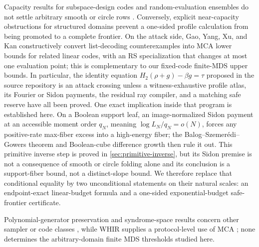 \documentclass[11pt,a4paper]{amsart}
\numberwithin{equation}{section}
\theoremstyle{remark}
\begin{document}
Capacity results for subspace-design codes and random-evaluation ensembles
do not settle arbitrary smooth or circle rows
\cite{GoyalGuruswami25,GoyalGuruswamiSunWootters26}.  Conversely, explicit
near-capacity obstructions for structured domains
\cite{CS25,KKH26,Kambire26} prevent a one-sided profile calculation from
being promoted to a complete frontier.  On the attack side, Gao, Yang, Xu,
and Kan \cite{GaoYangXuKan26} constructively convert list-decoding
counterexamples into MCA lower bounds for related linear codes, with an
RS specialization that changes at most one evaluation point; this is
complementary to our fixed-code finite-MDS upper bounds.  In particular, the identity equation
\(H_2(\rho+g)-\beta g=\tau\) proposed in the source repository
\cite{RSMCARepo} is an attack crossing
unless a witness-exhaustive profile atlas, its Fourier or Sidon payments,
the residual ray compiler, and a matching safe reserve have all been proved.
One exact implication inside that program is established here.  On a
Boolean support leaf, an image-normalized Sidon payment at an accessible
moment order \(q_N\), meaning \(\log L_N/q_N=o(N)\), forces any positive-rate
max-fiber excess into a high-energy fiber; the Balog--Szemer\'edi--Gowers
theorem and Boolean-cube difference growth then rule it out.  This
primitive inverse step is proved in
\cref{sec:primitive-inverse}, but its Sidon premise is not a consequence of
smooth or circle folding alone and its conclusion is a support-fiber bound,
not a distinct-slope bound.
We therefore replace that conditional equality by two unconditional
statements on their natural scales: an endpoint-exact linear-budget formula
and a one-sided exponential-budget safe-frontier certificate.

Polynomial-generator preservation and syndrome-space results concern other
sampler or code classes \cite{BordageChiesaGuanManzur25,YuanZhu26}, while
WHIR supplies a protocol-level use of MCA \cite{WHIR}; none determines the
arbitrary-domain finite MDS thresholds studied here.
\end{document}
